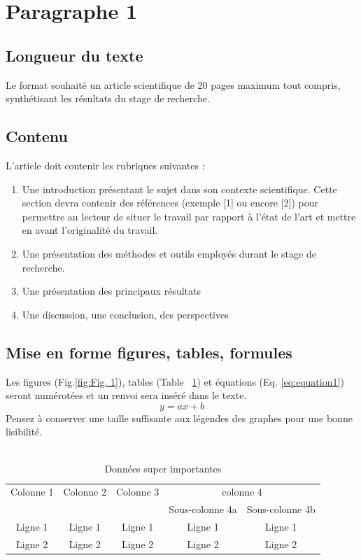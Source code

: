 \documentclass{article}
\begin{document}
\section{Paragraphe 1}
\subsection{Longueur du texte}
Le format souhaité un article scientifique de 20 pages maximum tout compris, synthétisant les résultats du stage de recherche.
\subsection{Contenu}
L’article doit contenir les rubriques suivantes :
\begin{enumerate}
    \item Une introduction présentant le sujet dans son contexte scientifique. Cette section devra contenir des références (exemple [1] ou encore [2]) pour permettre au lecteur de situer le travail par rapport à l’état de l’art et mettre en avant l’originalité du travail.
    \item Une présentation des méthodes et outils employés durant le stage de recherche.
    \item Une présentation des principaux résultats
    \item Une discussion, une conclusion, des perspectives
\end{enumerate}
\subsection{Mise en forme figures, tables, formules}
Les figures (Fig.\ref{fig:Fig. 1}), tables (Table ~\ref{tab:Table 1}) et équations (Eq. \ref{eq:equation1}) seront numérotées et un renvoi sera inséré dans le texte.
\begin{equation}
y =  ax+b
\label{eq:equation1}
\end{equation}
Pensez à conserver une taille suffisante aux légendes des graphes pour une bonne lisibilité.\\
\\
\begin{table}[htb]\centering
\begin{tabular}{ccccc}
\toprule
     Colonne 1&Colonne 2&Colonne 3&\multicolumn{2}{c}{colonne 4}\\\cmidrule{4-5}
      &	 &	&	Sous-colonne 4a	&Sous-colonne 4b\\ \midrule
      Ligne 1	&Ligne 1&	Ligne 1&	Ligne 1&	Ligne 1\\
      Ligne 2	&Ligne 2&	Ligne 2	&Ligne 2&	Ligne 2\\
      \bottomrule
\end{tabular}
\caption{Données super importantes}
\label{tab:Table 1}
\end{table}
\end{document}
